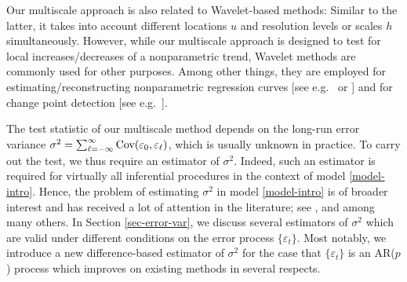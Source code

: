 Our multiscale approach is also related to Wavelet-based methods: Similar to the latter, it takes into account different locations $u$ and resolution levels or scales $h$ simultaneously. However, while our multiscale approach is designed to test for local increases/decreases of a nonparametric trend, Wavelet methods are commonly used for other purposes. Among other things, they are employed for estimating/reconstructing nonparametric regression curves [see e.g.\ \cite{Donoho1995} or \cite{vonSachsMacGibbon2000}] and for change point detection [see e.g.\ \citet{ChoFryzlewicz2012}]. 




The test statistic of our multiscale method depends on the long-run error variance $\sigma^2 = \sum\nolimits_{\ell=-\infty}^{\infty} \textnormal{Cov}(\varepsilon_0,\varepsilon_{\ell})$, which is usually unknown in practice. To carry out the test, we thus require an estimator of $\sigma^2$. Indeed, such an estimator is required for virtually all inferential procedures in the context of model \eqref{model-intro}. Hence, the problem of estimating $\sigma^2$ in model \eqref{model-intro} is of broader interest and has received a lot of attention in the literature; see \cite{MuellerStadtmueller1988}, \cite{Herrmann1992} and \cite{Hall2003} among many others. In Section \ref{sec-error-var}, we discuss several estimators of $\sigma^2$ which are valid under different conditions on the error process $\{\varepsilon_t\}$. Most notably, we introduce a new difference-based estimator of $\sigma^2$ for the case that $\{ \varepsilon_t \}$ is an AR($p$) process which improves on existing methods in several respects. 


